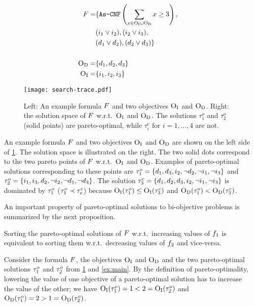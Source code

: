 \begin{figure}
  \begin{minipage}{0.36\textwidth}
  \footnotesize
  \begin{align*}
  F = &\{ \texttt{As-CNF}\left(\sum_ {x \in \textsc{O}_{\text{I}} \cup \textsc{O}_{\text{D}}} x \geq 3 \right), \\
  			&(i_1 \lor i_2),  (i_2 \lor i_3), \\
		 &(d_1 \lor d_2), (d_2 \lor d_3) \} \\ \\
  \textsc{O}_{\text{D}} =&\{ d_1,d_2, d_3\}   \\ 
  \textsc{O}_{\text{I}} =&\{ i_1,i_2, i_3\}  
  \end{align*}
  \end{minipage}
  \;
  \begin{minipage}{0.6\textwidth}
    \texttt{[image: search-trace.pdf]}
  \end{minipage}
  \caption{Left: An example formula $F$ and two objectives $\textsc{O}_{\text{I}}$ and $\textsc{O}_{\text{D}}$.
    Right: the solution space of $F$ w.r.t.\ $\textsc{O}_{\text{I}}$ and $\textsc{O}_{\text{D}}$.
    The solutions $\tau^o_1$ and $\tau^o_2$ (solid points) are pareto-optimal, while $\tau^c_i$ for $i=1,\ldots,4$ are not.\label{fig:search-trace}}
\end{figure}
\begin{example}\label{ex:main}
  An example formula $F$ and two objectives $\textsc{O}_{\text{I}}$ and $\textsc{O}_{\text{D}}$ are shown on the left side of \cref{fig:search-trace}. 
  The solution space is illustrated on the right.
  The two solid dots correspond to the two pareto points of $F$ w.r.t.\ $\textsc{O}_{\text{I}}$ and $\textsc{O}_{\text{D}}$. 
  Examples of pareto-optimal solutions corresponding to these points are $\tau^o_1 = \{d_1, d_3, i_2, \lnot d_2, \lnot i_1, \lnot i_3\}$ and $\tau^o_2 = \{i_1, i_3, d_2, \lnot i_2, \lnot d_1, \lnot d_3\}$.
  The solution $\tau^c_3 = \{d_1, d_2, d_3, i_2, \lnot i_1, \lnot i_3\}$ is dominated by $\tau^o_1$ ($\tau^o_1 \prec \tau^c_e$) because $\textsc{O}_{\text{I}}(\tau^o_1) \leq \textsc{O}_{\text{I}}(\tau^c_3)$ and $\textsc{O}_{\text{D}}(\tau^o_1) < \textsc{O}_{\text{D}}(\tau^c_3)$.
\end{example}

An important property of pareto-optimal solutions to bi-objective problems is summarized by the next proposition.
\begin{proposition} \label{prop:biobjective}
  Sorting the pareto-optimal solutions of $F$ w.r.t.\ increasing values of $f_1$ is equivalent to sorting them w.r.t.\ decreasing values of $f_2$ and vice-versa.
\end{proposition}
\begin{example}
  Consider the formula $F$, the objectives $\textsc{O}_{\text{I}}$ and $\textsc{O}_{\text{D}}$ and the two pareto-optimal solutions $\tau^o_1$ and $\tau^o_2$ from \cref{fig:search-trace} and \cref{ex:main}.
  By the definition of pareto-optimality, lowering the value of one objective of a pareto-optimal solution has to increase the value of the other;
  we have $\textsc{O}_{\text{I}}(\tau^o_1) = 1 < 2 = \textsc{O}_{\text{I}}(\tau^o_2)$ and $\textsc{O}_{\text{D}}(\tau^o_1) = 2 > 1 = \textsc{O}_{\text{D}}(\tau^o_2)$.
\end{example}

